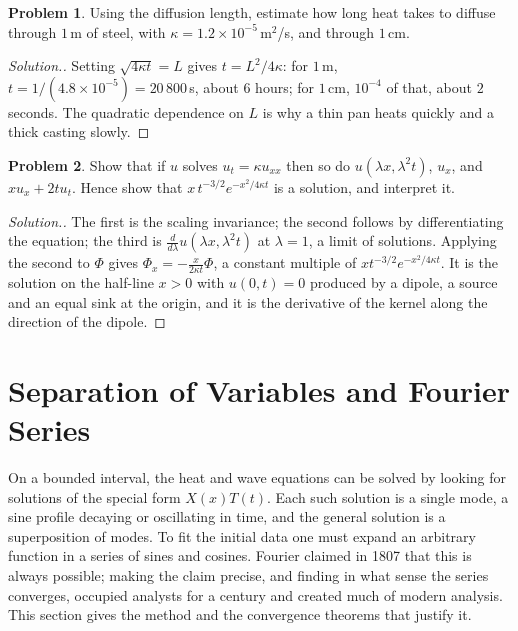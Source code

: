 \documentclass[11pt,a4paper]{article}
\numberwithin{equation}{section}
\theoremstyle{definition}
\newtheorem{problemx}{Problem}[subsection]
\newenvironment{problem}{\begin{problemx}}{\end{problemx}}
\newenvironment{solution}
  {\renewcommand{\qedsymbol}{}\begin{proof}[\textit{Solution}.]}
  {\end{proof}}
\begin{document}
\begin{problem}
Using the diffusion length, estimate how long heat takes to diffuse through $1$\,m of steel, with $\kappa = 1.2 \times 10^{-5}$\,m$^2$/s, and through $1$\,cm.
\end{problem}

\begin{solution}
Setting $\sqrt{4\kappa t} = L$ gives $t = L^2/4\kappa$: for $1$\,m, $t = 1/(4.8 \times 10^{-5}) = 20\,800$\,s, about $6$ hours; for $1$\,cm, $10^{-4}$ of that, about $2$ seconds. The quadratic dependence on $L$ is why a thin pan heats quickly and a thick casting slowly.
\end{solution}

\begin{problem}
Show that if $u$ solves $u_t = \kappa u_{xx}$ then so do $u(\lambda x, \lambda^2t)$, $u_x$, and $xu_x + 2tu_t$. Hence show that $x\,t^{-3/2}e^{-x^2/4\kappa t}$ is a solution, and interpret it.
\end{problem}

\begin{solution}
The first is the scaling invariance; the second follows by differentiating the equation; the third is $\frac{d}{d\lambda}u(\lambda x, \lambda^2t)$ at $\lambda = 1$, a limit of solutions. Applying the second to $\Phi$ gives $\Phi_x = -\frac{x}{2\kappa t}\Phi$, a constant multiple of $xt^{-3/2}e^{-x^2/4\kappa t}$. It is the solution
on the half-line $x > 0$ with $u(0, t) = 0$ produced by a dipole, a source and an equal sink at the origin, and it is the derivative of the kernel along the direction of the dipole.
\end{solution}

\section{Separation of Variables and Fourier Series}
\label{sec:fourier}

On a bounded interval, the heat and wave equations can be solved by looking for solutions of the special form $X(x)T(t)$. Each such solution is a single mode, a sine profile decaying or oscillating in time, and the general solution is a superposition of modes. To fit the initial data one must
expand an arbitrary function in a series of sines and cosines. Fourier claimed in 1807 that this is always possible; making the claim precise, and finding in what sense the series converges, occupied analysts for a century and created much of modern analysis. This section gives the method and the
convergence theorems that justify it.
\end{document}
